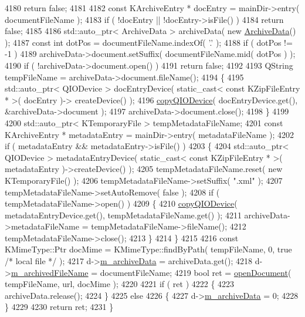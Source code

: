 \begin{DoxyCode}
4180         \textcolor{keywordflow}{return} \textcolor{keyword}{false};
4181 
4182     \textcolor{keyword}{const} KArchiveEntry * docEntry = mainDir->entry( documentFileName );
4183     \textcolor{keywordflow}{if} ( !docEntry || !docEntry->isFile() )
4184         \textcolor{keywordflow}{return} \textcolor{keyword}{false};
4185 
4186     std::auto\_ptr< ArchiveData > archiveData( \textcolor{keyword}{new} \hyperlink{structArchiveData}{ArchiveData}() );
4187     \textcolor{keyword}{const} \textcolor{keywordtype}{int} dotPos = documentFileName.indexOf( \textcolor{charliteral}{'.'} );
4188     \textcolor{keywordflow}{if} ( dotPos != -1 )
4189         archiveData->document.setSuffix( documentFileName.mid( dotPos ) );
4190     \textcolor{keywordflow}{if} ( !archiveData->document.open() )
4191         \textcolor{keywordflow}{return} \textcolor{keyword}{false};
4192 
4193     QString tempFileName = archiveData->document.fileName();
4194     \{
4195     std::auto\_ptr< QIODevice > docEntryDevice( static\_cast< const KZipFileEntry * >( docEntry )->
      createDevice() );
4196     \hyperlink{namespaceOkular_a862e1662eae79bca93b3d148ada9ad88}{copyQIODevice}( docEntryDevice.get(), &archiveData->document );
4197     archiveData->document.close();
4198     \}
4199 
4200     std::auto\_ptr< KTemporaryFile > tempMetadataFileName;
4201     \textcolor{keyword}{const} KArchiveEntry * metadataEntry = mainDir->entry( metadataFileName );
4202     \textcolor{keywordflow}{if} ( metadataEntry && metadataEntry->isFile() )
4203     \{
4204         std::auto\_ptr< QIODevice > metadataEntryDevice( static\_cast< const KZipFileEntry * >( metadataEntry
       )->createDevice() );
4205         tempMetadataFileName.reset( \textcolor{keyword}{new} KTemporaryFile() );
4206         tempMetadataFileName->setSuffix( \textcolor{stringliteral}{".xml"} );
4207         tempMetadataFileName->setAutoRemove( \textcolor{keyword}{false} );
4208         \textcolor{keywordflow}{if} ( tempMetadataFileName->open() )
4209         \{
4210             \hyperlink{namespaceOkular_a862e1662eae79bca93b3d148ada9ad88}{copyQIODevice}( metadataEntryDevice.get(), tempMetadataFileName.get() );
4211             archiveData->metadataFileName = tempMetadataFileName->fileName();
4212             tempMetadataFileName->close();
4213         \}
4214     \}
4215 
4216     \textcolor{keyword}{const} KMimeType::Ptr docMime = KMimeType::findByPath( tempFileName, 0, \textcolor{keyword}{true} \textcolor{comment}{/* local file */} );
4217     d->\hyperlink{classOkular_1_1DocumentPrivate_a135bb6fa2886b0eb86e9a1b72fd8d25b}{m\_archiveData} = archiveData.get();
4218     d->\hyperlink{classOkular_1_1DocumentPrivate_ac47be11934cb0cb3e7d8876e3e4653af}{m\_archivedFileName} = documentFileName;
4219     \textcolor{keywordtype}{bool} ret = \hyperlink{classOkular_1_1Document_aaec42a1303846888ea6d3151d2be2c3e}{openDocument}( tempFileName, url, docMime );
4220 
4221     \textcolor{keywordflow}{if} ( ret )
4222     \{
4223         archiveData.release();
4224     \}
4225     \textcolor{keywordflow}{else}
4226     \{
4227         d->\hyperlink{classOkular_1_1DocumentPrivate_a135bb6fa2886b0eb86e9a1b72fd8d25b}{m\_archiveData} = 0;
4228     \}
4229 
4230     \textcolor{keywordflow}{return} ret;
4231 \}
\end{DoxyCode}
